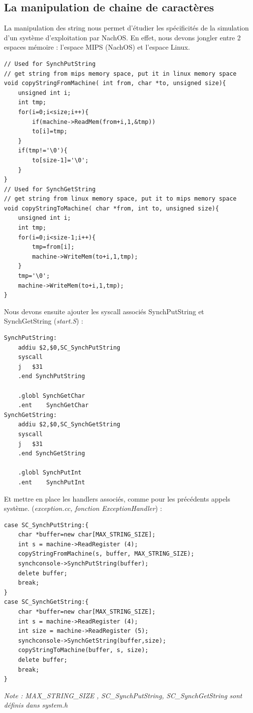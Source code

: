 \documentclass[a4paper,10pt]{article}
\begin{document}
\subsection{La manipulation de chaine de caractères}
La manipulation des string nous permet d'étudier les spécificités de la simulation d'un système d'exploitation par NachOS.
En effet, nous devons jongler entre 2 espaces mémoire : l'espace MIPS (NachOS) et l'espace Linux.
\begin{lstlisting}[frame=single]
// Used for SynchPutString 
// get string from mips memory space, put it in linux memory space
void copyStringFromMachine( int from, char *to, unsigned size){
	unsigned int i;
	int tmp;
	for(i=0;i<size;i++){
		if(machine->ReadMem(from+i,1,&tmp))
		to[i]=tmp;
	}
	if(tmp!='\0'){
		to[size-1]='\0';
	}
}
// Used for SynchGetString
// get string from linux memory space, put it to mips memory space
void copyStringToMachine( char *from, int to, unsigned size){
	unsigned int i;
	int tmp;
	for(i=0;i<size-1;i++){
		tmp=from[i];
		machine->WriteMem(to+i,1,tmp);
	}
	tmp='\0';
	machine->WriteMem(to+i,1,tmp);
}
\end{lstlisting}

Nous devons ensuite ajouter les syscall associés SynchPutString et SynchGetString (\textit{start.S}) :
\begin{lstlisting}[frame=single]
 SynchPutString:
	addiu $2,$0,SC_SynchPutString
	syscall
	j	$31
	.end SynchPutString

	.globl SynchGetChar
	.ent	SynchGetChar
SynchGetString:
	addiu $2,$0,SC_SynchGetString
	syscall
	j	$31
	.end SynchGetString

	.globl SynchPutInt
	.ent	SynchPutInt
\end{lstlisting}
\newpage
Et mettre en place les handlers associés, comme pour les précédents appels système. (\textit{exception.cc, fonction ExceptionHandler}) :
\begin{lstlisting}[frame=single]
case SC_SynchPutString:{
	char *buffer=new char[MAX_STRING_SIZE];
	int s = machine->ReadRegister (4);
	copyStringFromMachine(s, buffer, MAX_STRING_SIZE);
	synchconsole->SynchPutString(buffer);
	delete buffer;
	break;
}
case SC_SynchGetString:{
	char *buffer=new char[MAX_STRING_SIZE];
	int s = machine->ReadRegister (4);
	int size = machine->ReadRegister (5);
	synchconsole->SynchGetString(buffer,size);
	copyStringToMachine(buffer, s, size);
	delete buffer;
	break;
}
\end{lstlisting}
\textit{Note : MAX\_STRING\_SIZE , SC\_SynchPutString, SC\_SynchGetString sont définis dans system.h }
\newpage
\end{document}
